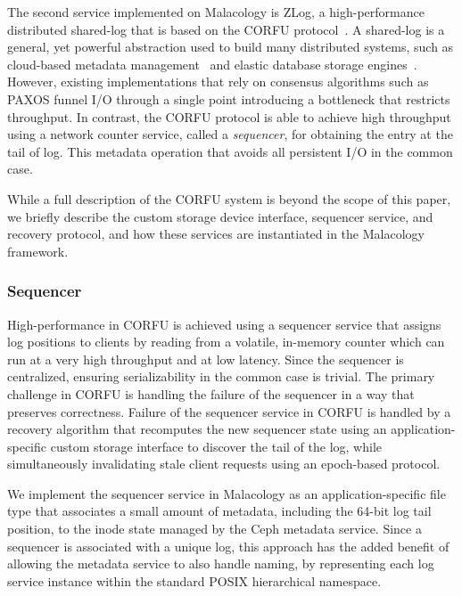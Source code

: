 \documentclass[preprint]{sigplanconf-eurosys}
\begin{document}
The second service implemented on Malacology is ZLog, a high-performance
distributed shared-log that is based on the CORFU
protocol~\cite{balakrishnan_corfu_2012}. A shared-log is a general, yet
powerful abstraction used to build many distributed systems, such as
cloud-based metadata management~\cite{balakrishnan:sosp13} and elastic database
storage engines~\cite{bernstein:cidr11,bernstein:vldb11,bernstein:sigmod15}.
However, existing implementations that rely on consensus algorithms such as
PAXOS funnel I/O through a single point introducing a bottleneck that restricts
throughput.  In contrast, the CORFU protocol is able to achieve high throughput
using a network counter service, called a \emph{sequencer}, for obtaining the
entry at the tail of log. This metadata operation that avoids all persistent
I/O in the common case.

While a full description of the CORFU system is beyond the scope of this
paper, we briefly describe the custom storage device interface, sequencer
service, and recovery protocol, and how these services are instantiated in the
Malacology framework.

\subsubsection{Sequencer}

High-performance in CORFU is achieved using a sequencer service that assigns
log positions to clients by reading from a volatile, in-memory counter which
can run at a very high throughput and at low latency. Since the sequencer
is centralized, ensuring serializability in the common case is trivial.  The
primary challenge in CORFU is handling the failure of the sequencer in a way
that preserves correctness. Failure of the sequencer service in CORFU is
handled by a recovery algorithm that recomputes the new sequencer state using
an application-specific custom storage interface to discover the tail of the
log, while simultaneously invalidating stale client requests using an
epoch-based protocol.

We implement the sequencer service in Malacology as an application-specific
file type that associates a small amount of metadata, including the 64-bit log
tail position, to the inode state managed by the Ceph metadata service. Since
a sequencer is associated with a unique log, this approach has the added
benefit of allowing the metadata service to also handle naming, by
representing each log service instance within the standard POSIX hierarchical
namespace.
\end{document}
